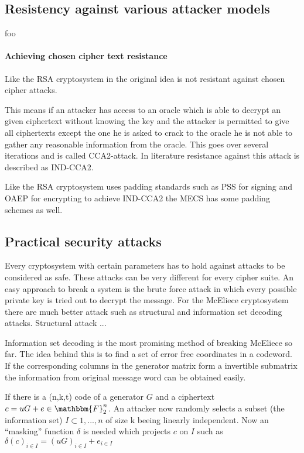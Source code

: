 \subsection{Resistency against various attacker models}
foo
\paragraph{Achieving chosen cipher text resistance}

Like the RSA cryptosystem in the original idea is not resistant against chosen cipher attacks. 

This means if an attacker has access to an oracle which is able to decrypt an given ciphertext without knowing the key and the attacker is permitted to give all ciphertexts except the one he is asked to crack to the oracle he is not able to gather any reasonable information from the oracle. This goes over several iterations and is called CCA2-attack. In literature resistance against this attack is described as IND-CCA2. 


Like the RSA cryptosystem uses padding standards such as PSS for signing and OAEP for encrypting to achieve IND-CCA2 the MECS has some padding schemes as well.


\subsection{Practical security attacks}
\label{keylength}
Every cryptosystem with certain parameters has to hold against attacks to be considered as safe. These attacks can be very different for every cipher suite. An easy approach to break a system is the brute force attack in which every possible private key is tried out to decrypt the message. 
For the McEliece cryptosystem there are much better attack such as structural and information set decoding attacks. 
Structural attack ...

Information set decoding is the most promising method of breaking McEliece so far. The idea behind this is to find a set of error free coordinates in a codeword. If the corresponding columns in the generator matrix form a invertible submatrix the information from original message word can be obtained easily. 

 If there is a (n,k,t) code of a generator $G$ and a ciphertext $c = uG + e \in  \mathbbm{F}^n_2$. An attacker now randomly selects a subset (the information set) $I \subset 1, ..., n$ of size k beeing linearly independent. Now an ``masking'' function $\delta$ is needed which projects $c$ on $I$ such as $\delta(c)_{i \in I} = (uG)_{i\in I}+e_{i\in I}$
 
